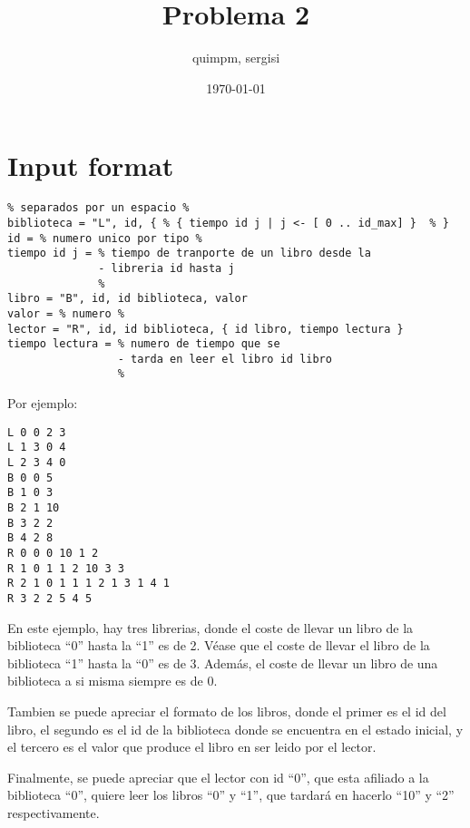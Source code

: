 \documentclass[11pt]{article}
\author{quimpm, sergisi}
\date{\today}
\title{Problema 2}
\begin{document}
\maketitle
\tableofcontents


\section{Input format}
\label{sec:org5a60226}

\begin{verbatim}
% separados por un espacio %
biblioteca = "L", id, { % { tiempo id j | j <- [ 0 .. id_max] }  % }
id = % numero unico por tipo %
tiempo id j = % tiempo de tranporte de un libro desde la
              - libreria id hasta j
              %
libro = "B", id, id biblioteca, valor
valor = % numero %
lector = "R", id, id biblioteca, { id libro, tiempo lectura }
tiempo lectura = % numero de tiempo que se
                 - tarda en leer el libro id libro
                 %
\end{verbatim}

Por ejemplo:
\begin{verbatim}
L 0 0 2 3
L 1 3 0 4
L 2 3 4 0
B 0 0 5
B 1 0 3
B 2 1 10
B 3 2 2
B 4 2 8
R 0 0 0 10 1 2
R 1 0 1 1 2 10 3 3
R 2 1 0 1 1 1 2 1 3 1 4 1
R 3 2 2 5 4 5
\end{verbatim}

En este ejemplo, hay tres librerias, donde el coste de llevar un libro
de la biblioteca ``0'' hasta la ``1'' es de 2. Véase que el coste de llevar
el libro de la biblioteca ``1'' hasta la ``0'' es de 3. Además, el coste de
llevar un libro de una biblioteca a si misma siempre es de 0.

Tambien se puede apreciar el formato de los libros, donde el primer es
el id del libro, el segundo es el id de la biblioteca donde se encuentra
en el estado inicial, y el tercero es el valor que produce el libro en
ser leido por el lector.

Finalmente, se puede apreciar que el lector con id ``0'', que esta afiliado
a la biblioteca ``0'', quiere leer los libros ``0'' y ``1'', que tardará en
hacerlo ``10'' y ``2'' respectivamente.
\end{document}
